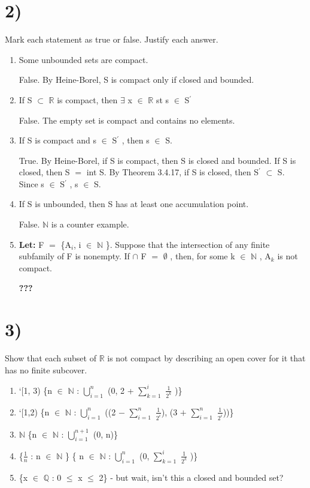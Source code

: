 \documentclass{article}
\newcommand{\mt}[1]{\ensuremath{#1}}
\newcommand\bsc[2][\DefaultOpt]{%
  \def\DefaultOpt{#2}%
  \section[#1]{#2}%
}
\newcommand{\balist}{\begin{enumerate}[label=\alph*.]}
\newcommand{\elist}{\end{enumerate}}
\newcommand{\lt}[1]{\textbf{Let: } #1}
\newcommand{\br}{\mt{\mathbb{R}} }       %
\newcommand{\bq}{\mt{\mathbb{Q}} }       %
\newcommand{\bn}{\mt{\mathbb{N}} }       %
\newcommand{\mem}{\mt{\in} }
\newcommand{\exs}{\mt{\exists} }
\newcommand{\es}{\mt{\emptyset} }        %
\newcommand{\sbs}{\mt{\subset} }         %
\newcommand{\eql}{\mt{=} }
\newcommand{\pr}{\mt{^\prime} } 		   %
\newcommand{\uw}[2]{#1\mt{_{#2}}}
\newcommand{\frc}[2]{\mt{\frac{#1}{#2}}}
\newcommand{\urng}[2]{\mt{\bigcup_{#1}^{#2}}}
\begin{document}
\bsc{2)}{
Mark each statement as true or false. Justify each answer.

\balist
\item Some unbounded sets are compact.

	False. By Heine-Borel, S is compact only if closed and bounded.
	
\item If S \sbs \br is compact, then \exs x \mem \br st s \mem S\pr
	
	False. The empty set is compact and contains no elements.
	
\item If S is compact and s \mem S\pr, then s \mem S.
	
	True. By Heine-Borel, if S is compact, then S is closed and bounded. If S is closed, then S \eql int S. By Theorem 3.4.17, if S is closed, then S\pr \sbs S. Since s \mem S\pr, s \mem S.
\item If S is unbounded, then S has at least one accumulation point.
	
	False. \bn is a counter example.
\item \lt{F \eql \{\uw{A}{i}, i \mem \bn\}}. Suppose that the intersection of any finite subfamily of F is nonempty. If $\cap$ F \eql \es, then, for some k \mem \bn, \uw{A}{k} is not compact.

	\textbf{???}
\elist


}

\bsc{3)}{
Show that each subset of \br is not compact by describing an open cover for it that has no finite subcover.

\balist
\item `[1, 3) \{n \mem \bn : \urng{i = 1}{n} (0, 2 + $\sum_{k = 1}^i$ \frc{1}{2^k} )\}
\item `[1,2)  \{n \mem \bn : \urng{i = 1}{n} ((2 $-$ $\sum_{i = 1}^n$ \frc{1}{2^i}), (3 $+$ $\sum_{i = 1}^n$ \frc{1}{2^i}))\}
\item \bn \textrm{        } \{n \mem \bn: \urng{i = 1}{n + 1} (0, n)\}
\item \{\frc{1}{n} : n \mem \bn\}   \{ n \mem \bn: \urng{i = 1}{n} (0, $\sum_{k = 1}^i$ \frc{1}{2^k} )\}
\item \{x \mem \bq : 0 $\leq$ x $\leq$ 2\} - but wait, isn't this a closed and bounded set?
\elist

}
\end{document}
